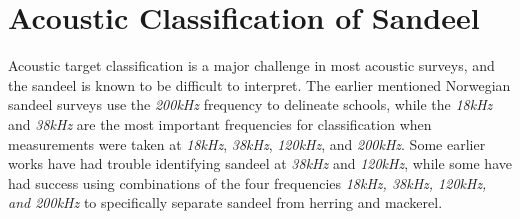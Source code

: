     

    
        

\section{Acoustic Classification of Sandeel} \label{acoustic classification sandeel}

    Acoustic target classification is a major challenge in most acoustic surveys, and the sandeel is known to be difficult to interpret\cite{sizedependentfreqrespons2009johnsen,johnsen2017collective}.  The earlier mentioned Norwegian sandeel surveys use the \textit{200kHz} frequency to delineate schools, while the \textit{18kHz} and \textit{38kHz} are the most important frequencies for classification when measurements were taken at \textit{18kHz}, \textit{38kHz}, \textit{120kHz}, and \textit{200kHz}\cite{sizedependentfreqrespons2009johnsen}. Some earlier works have had trouble identifying sandeel at \textit{38kHz} and \textit{120kHz}\cite{hassel2004influence,mackinson2005using,mosteiro2004dual}, while some have had success using combinations of the four frequencies \textit{18kHz, 38kHz, 120kHz, and 200kHz} to specifically separate sandeel from herring and mackerel\cite{mohammed2006acoustic}. 

